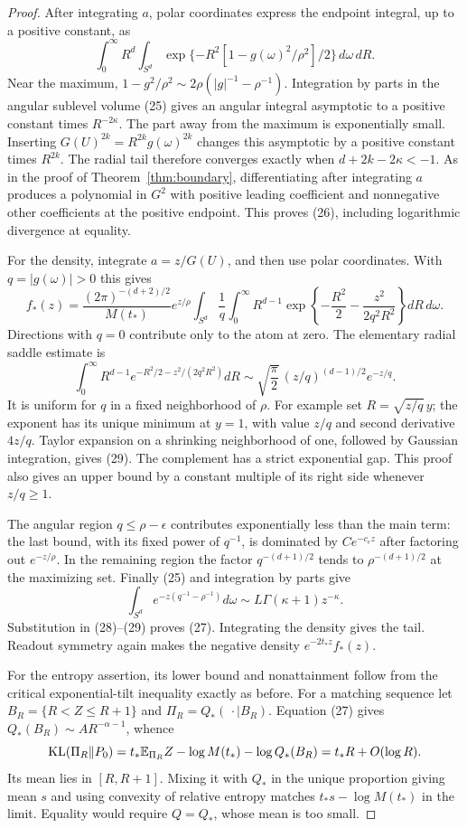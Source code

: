 \begin{proof}
After integrating $a$, polar coordinates express the endpoint integral,
up to a positive constant, as
\[
 \int_0^\infty R^d\int_{S^d}
       \exp\{-R^2[1-g(\omega)^2/\rho^2]/2\}\,d\omega\,dR.
\]
Near the maximum,
$1-g^2/\rho^2\sim2\rho(|g|^{-1}-\rho^{-1})$.
Integration by parts in the angular sublevel volume (25) gives an
angular integral asymptotic to a positive constant times $R^{-2\kappa}$.
The part away from the maximum is exponentially small. Inserting
$G(U)^{2k}=R^{2k}g(\omega)^{2k}$ changes this asymptotic by a
positive constant times $R^{2k}$. The radial tail therefore converges
exactly when $d+2k-2\kappa<-1$. As in the proof of
Theorem~\ref{thm:boundary}, differentiating after integrating $a$
produces a polynomial in $G^2$ with positive leading coefficient and
nonnegative other coefficients at the positive endpoint. This proves
(26), including logarithmic divergence at equality.

For the density, integrate $a=z/G(U)$, and then use polar coordinates.
With $q=|g(\omega)|>0$ this gives
\[
 f_*(z)=\frac{(2\pi)^{-(d+2)/2}}{M(t_*)}e^{z/\rho}
 \int_{S^d}\frac1q\int_0^\infty
 R^{d-1}\exp\left\{-\frac{R^2}2-\frac{z^2}{2q^2R^2}\right\}
                                           dR\,d\omega. \tag{28}
\]
Directions with $q=0$ contribute only to the atom at zero.
The elementary radial saddle estimate is
\[
 \int_0^\infty R^{d-1}e^{-R^2/2-z^2/(2q^2R^2)}dR
 \sim\sqrt{\frac\pi2}\,(z/q)^{(d-1)/2}e^{-z/q}.
 \tag{29}
\]
It is uniform for $q$ in a fixed neighborhood of $\rho$.
For example set $R=\sqrt{z/q}\,y$; the exponent has its unique
minimum at $y=1$, with value $z/q$ and second derivative $4z/q$.
Taylor expansion on a shrinking neighborhood of one, followed by
Gaussian integration, gives (29). The complement has a strict
exponential gap. This proof also gives an upper bound by a constant
multiple of its right side whenever $z/q\ge1$.

The angular region $q\le\rho-\epsilon$ contributes exponentially
less than the main term: the last bound, with its fixed power of
$q^{-1}$, is dominated by $C e^{-c_\epsilon z}$ after factoring
out $e^{-z/\rho}$. In the remaining region the factor
$q^{-(d+1)/2}$ tends to $\rho^{-(d+1)/2}$ at the maximizing set.
Finally (25) and integration by parts give
\[
 \int_{S^d}e^{-z(q^{-1}-\rho^{-1})}d\omega
       \sim L\Gamma(\kappa+1)z^{-\kappa}.
\]
Substitution in (28)--(29) proves (27). Integrating the density gives
the tail. Readout symmetry again makes the negative density
$e^{-2t_*z}f_*(z)$.

For the entropy assertion, its lower bound and nonattainment follow
from the critical exponential-tilt inequality exactly as before.
For a matching sequence let $B_R=\{R<Z\le R+1\}$ and
$\Pi_R=Q_*(\,\cdot\mid B_R)$. Equation (27) gives
$Q_*(B_R)\sim A R^{-\alpha-1}$, whence
\[
 \operatorname{KL}(\Pi_R\|P_0)
 =t_*\mathbb E_{\Pi_R}Z-\log M(t_*)-\log Q_*(B_R)
                  =t_*R+O(\log R).
\]
Its mean lies in $[R,R+1]$. Mixing it with $Q_*$ in the unique
proportion giving mean $s$ and using convexity of relative entropy
matches $t_*s-\log M(t_*)$ in the limit. Equality would require
$Q=Q_*$, whose mean is too small.
\end{proof}

